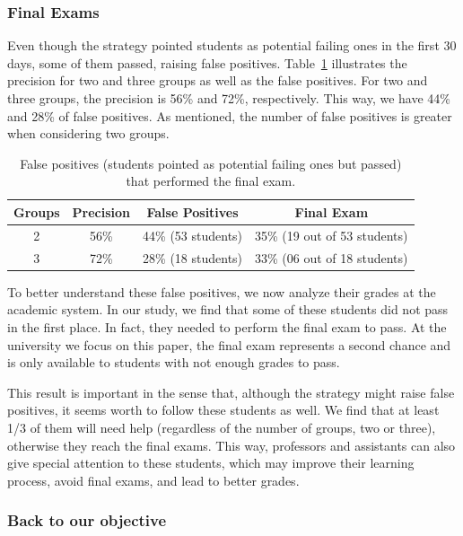 
\subsubsection{Final Exams}

Even though the strategy pointed students as potential failing ones in the first 30 days, some of them passed, raising false positives. Table~\ref{tab:final-exams} illustrates the precision for two and three groups as well as the false positives. For two and three groups, the precision is 56\% and 72\%, respectively. This way, we have 44\% and 28\% of false positives. As mentioned, the number of false positives is greater when considering two groups.

\begin{table}[h]
\centering
\begin{tabular}{|c|c|c|c|}
\hline
\textbf{Groups} & \textbf{Precision} & \textbf{False Positives} & \textbf{Final Exam}\\ \hline
2 & 56\% & 44\% (53 students) & 35\% (19 out of 53 students)\\ \hline
3 & 72\% & 28\% (18 students) & 33\% (06 out of 18 students)\\ \hline
\end{tabular}
\caption{False positives (students pointed as potential failing ones but passed) that performed the final exam.}
\label{tab:final-exams}
\end{table}

To better understand these false positives, we now analyze their grades at the academic system. In our study, we find that some of these students did not pass in the first place. In fact, they needed to perform the final exam to pass. At the university we focus on this paper, the final exam represents a second chance and is only available to students with not enough grades to pass.

This result is important in the sense that, although the strategy might raise false positives, it seems worth to follow these students as well. We find that at least 1/3 of them will need help (regardless of the number of groups, two or three), otherwise they reach the final exams. This way, professors and assistants can also give special attention to these students, which may improve their learning process, avoid final exams, and lead to better grades.

\subsubsection{Back to our objective}

